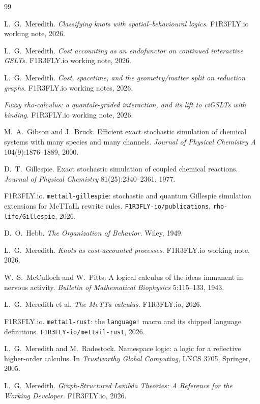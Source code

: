 \documentclass[11pt,a4paper]{article}
\theoremstyle{plain}
\theoremstyle{definition}
\theoremstyle{remark}
\begin{document}
\begin{thebibliography}{99}

 L.\ G.\ Meredith. \emph{Classifying knots with spatial--behavioural logics.}
F1R3FLY.io working note, 2026.

 L.\ G.\ Meredith. \emph{Cost accounting as an endofunctor on continued
interactive GSLTs.} F1R3FLY.io working note, 2026.

 L.\ G.\ Meredith. \emph{Cost, spacetime, and the geometry/matter split on
reduction graphs.} F1R3FLY.io working notes, 2026.

 \emph{Fuzzy rho-calculus: a quantale-graded interaction, and its lift to ciGSLTs with
binding.} F1R3FLY.io working note, 2026.

 M.\ A.\ Gibson and J.\ Bruck. Efficient exact stochastic simulation of
chemical systems with many species and many channels. \emph{Journal of Physical Chemistry A}
104(9):1876--1889, 2000.

 D.\ T.\ Gillespie. Exact stochastic simulation of coupled chemical reactions.
\emph{Journal of Physical Chemistry} 81(25):2340--2361, 1977.

 F1R3FLY.io. \texttt{mettail-gillespie}: stochastic and quantum Gillespie
simulation extensions for MeTTaIL rewrite rules. \texttt{F1R3FLY-io/publications},
\texttt{rho-life/Gillespie}, 2026.

 D.\ O.\ Hebb. \emph{The Organization of Behavior.} Wiley, 1949.

 L.\ G.\ Meredith. \emph{Knots as cost-accounted processes.} F1R3FLY.io working note,
2026.

 W.\ S.\ McCulloch and W.\ Pitts. A logical calculus of the ideas immanent in nervous
activity. \emph{Bulletin of Mathematical Biophysics} 5:115--133, 1943.

 L.\ G.\ Meredith et al. \emph{The MeTTa calculus.} F1R3FLY.io, 2026.

 F1R3FLY.io. \texttt{mettail-rust}: the \texttt{language!} macro and its shipped
language definitions. \texttt{F1R3FLY-io/mettail-rust}, 2026.

 L.\ G.\ Meredith and M.\ Radestock. Namespace logic: a logic for a reflective
higher-order calculus. In \emph{Trustworthy Global Computing}, LNCS 3705, Springer, 2005.

 L.\ G.\ Meredith. \emph{Graph-Structured Lambda Theories: A Reference for the
Working Developer.} F1R3FLY.io, 2026.


\end{thebibliography}
\end{document}
